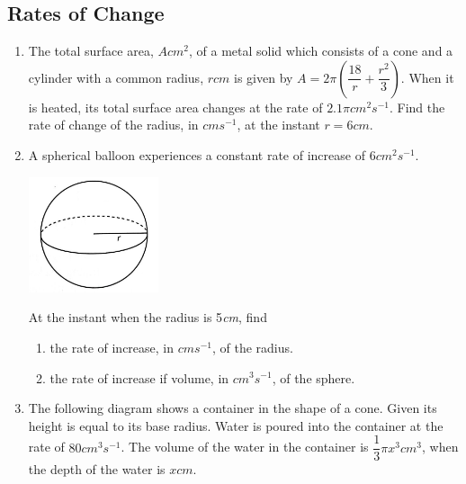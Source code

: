 \documentclass{report}
\begin{document}
\begin{multicols}{2}
      \subsection{Rates of Change}
      \begin{enumerate}
            \item The total surface area, $A\textit{cm}^2$, of a metal solid which consists of a
                  cone and a cylinder with a common radius, $r\textit{cm}$ is given by $A =
                        2\pi\left(\dfrac{18}{r} + \dfrac{r^2}{3}\right)$. When it is heated, its total
                  surface area changes at the rate of $2.1\pi \textit{cm}^2\textit{s}^{-1}$. Find
                  the rate of change of the radius, in $\textit{cm} \textit{s}^{-1}$, at the
                  instant $r = 6\textit{cm}$.
            \item A spherical balloon experiences a constant rate of increase of
                  $6\textit{cm}^2\textit{s}^{-1}$.
                  \begin{center}
                        \includegraphics[width=0.3\textwidth]{./images/q31.jpeg}
                  \end{center}
                  At the instant when the radius is 5\textit{cm}, find
                  \begin{enumerate}
                        \item the rate of increase, in $\textit{cm} \textit{s}^{-1}$, of the radius.
                        \item the rate of increase if volume, in $\textit{cm}^3 \textit{s}^{-1}$, of the
                              sphere.
                  \end{enumerate}
            \item The following diagram shows a container in the shape of a cone. Given its
                  height is equal to its base radius. Water is poured into the container at the
                  rate of $80\textit{cm}^3\textit{s}^{-1}$. The volume of the water in the
                  container is $\dfrac{1}{3}\pi x^3\textit{cm}^3$, when the depth of the water is
                  $x\textit{cm}$.

\end{enumerate}
\end{multicols}
\end{document}
